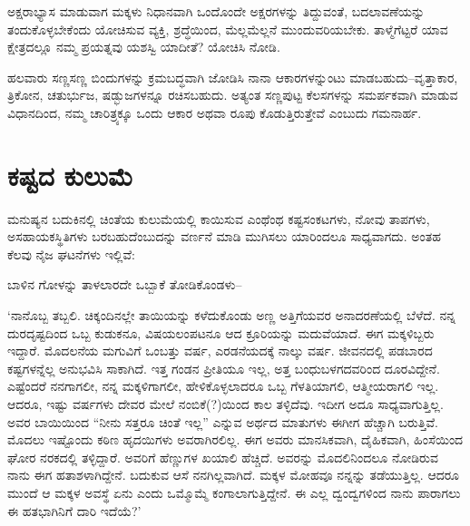 ಅಕ್ಷರಾಭ್ಯಾಸ ಮಾಡುವಾಗ ಮಕ್ಕಳು ನಿಧಾನವಾಗಿ ಒಂದೊಂದೇ ಅಕ್ಷರಗಳನ್ನು ತಿದ್ದುವಂತೆ, ಬದಲಾವಣೆಯನ್ನು ತಂದುಕೊಳ್ಳಬೇಕೆಂದು ಯೋಚಿಸುವ ವ್ಯಕ್ತಿ, ಶ್ರದ್ಧೆಯಿಂದ, ಮೆಲ್ಲಮೆಲ್ಲನೆ ಮುಂದುವರಿಯಬೇಕು. ತಾಳ್ಮೆಗೆಟ್ಟರೆ ಯಾವ ಕ್ಷೇತ್ರದಲ್ಲೂ ನಮ್ಮ ಪ್ರಯತ್ನವು ಯಶಸ್ವಿ ಯಾದೀತೆ? ಯೋಚಿಸಿ ನೋಡಿ.

ಹಲವಾರು ಸಣ್ಣಸಣ್ಣ ಬಿಂದುಗಳನ್ನು ಕ್ರಮಬದ್ಧವಾಗಿ ಜೋಡಿಸಿ ನಾನಾ ಆಕಾರಗಳನ್ನುಂಟು ಮಾಡಬಹುದು–ವೃತ್ತಾಕಾರ, ತ್ರಿಕೋನ, ಚತುರ್ಭುಜ, ಷಡ್ಭುಜಗಳನ್ನೂ ರಚಿಸಬಹುದು. ಅತ್ಯಂತ ಸಣ್ಣಪುಟ್ಟ ಕೆಲಸಗಳನ್ನು ಸಮರ್ಪಕವಾಗಿ ಮಾಡುವ ವಿಧಾನದಿಂದ, ನಮ್ಮ ಚಾರಿತ್ರ್ಯಕ್ಕೂ ಒಂದು ಆಕಾರ ಅಥವಾ ರೂಪು ಕೊಡುತ್ತಿರುತ್ತೇವೆ ಎಂಬುದು ಗಮನಾರ್ಹ.


\section*{ಕಷ್ಟದ ಕುಲುಮೆ}


ಮನುಷ್ಯನ ಬದುಕಿನಲ್ಲಿ ಚಿಂತೆಯ ಕುಲುಮೆಯಲ್ಲಿ ಕಾಯಿಸುವ ಎಂಥೆಂಥ ಕಷ್ಟಸಂಕಟಗಳು, ನೋವು ತಾಪಗಳು, ಅಸಹಾಯಕಸ್ಥಿತಿಗಳು ಬರಬಹುದೆಂಬುದನ್ನು ವರ್ಣನೆ ಮಾಡಿ ಮುಗಿಸಲು ಯಾರಿಂದಲೂ ಸಾಧ್ಯವಾಗದು. ಅಂತಹ ಕೆಲವು ನೈಜ ಘಟನೆಗಳು ಇಲ್ಲಿವೆ:

ಬಾಳಿನ ಗೋಳನ್ನು ತಾಳಲಾರದೇ ಒಬ್ಬಾಕೆ ತೋಡಿಕೊಂಡಳು–

\newpage

‘ನಾನೊಬ್ಬ ತಬ್ಬಲಿ. ಚಿಕ್ಕಂದಿನಲ್ಲೇ ತಾಯಿಯನ್ನು ಕಳೆದುಕೊಂಡು ಅಣ್ಣ ಅತ್ತಿಗೆಯವರ ಅನಾದರಣೆಯಲ್ಲಿ ಬೆಳೆದೆ. ನನ್ನ ದುರದೃಷ್ಟದಿಂದ ಒಬ್ಬ ಕುಡುಕನೂ, ವಿಷಯಲಂಪಟನೂ ಆದ ಕ್ರೂರಿಯನ್ನು ಮದುವೆಯಾದೆ. ಈಗ ಮಕ್ಕಳಿಬ್ಬರು ಇದ್ದಾರೆ. ಮೊದಲನೆಯ ಮಗುವಿಗೆ ಒಂಬತ್ತು ವರ್ಷ, ಎರಡನೆಯದಕ್ಕೆ ನಾಲ್ಕು ವರ್ಷ. ಜೀವನದಲ್ಲಿ ಪಡಬಾರದ ಕಷ್ಟಗಳನ್ನೆಲ್ಲ ಅನುಭವಿಸಿ ಸಾಕಾಗಿದೆ. ಇತ್ತ ಗಂಡನ ಪ್ರೀತಿಯೂ ಇಲ್ಲ, ಅತ್ತ ಬಂಧುಬಳಗದವರಿಂದ ದೂರ\-ವಿದ್ದೇನೆ. ಎಷ್ಟೆಂದರೆ ನನಗಾಗಲೀ, ನನ್ನ ಮಕ್ಕಳಿಗಾಗಲೀ, ಹೇಳಿಕೊಳ್ಳಲಾದರೂ ಒಬ್ಬ ಗೆಳತಿಯಾಗಲಿ, ಆತ್ಮೀಯರಾಗಲಿ ಇಲ್ಲ. ಆದರೂ, ಇಷ್ಟು ವರ್ಷಗಳು ದೇವರ ಮೇಲೆ ನಂಬಿಕೆ(?)ಯಿಂದ ಕಾಲ ತಳ್ಳಿದೆವು. ಇದೀಗ ಅದೂ ಸಾಧ್ಯವಾಗುತ್ತಿಲ್ಲ. ಅವರ ಬಾಯಿಯಿಂದ “ನೀನು ಸತ್ತರೂ ಚಿಂತೆ ಇಲ್ಲ” ಎನ್ನುವ ಅರ್ಥದ ಮಾತುಗಳು ಈಗೀಗ ಹೆಚ್ಚಾಗಿ ಬರುತ್ತಿವೆ. ಮೊದಲು ಇಷ್ಟೊಂದು ಕಠಿಣ ಹೃದಯಿಗಳು ಅವರಾಗಿರಲಿಲ್ಲ. ಈಗ ಅವರು ಮಾನಸಿಕವಾಗಿ, ದೈಹಿಕವಾಗಿ, ಹಿಂಸೆಯಿಂದ ಘೋರ ನರಕದಲ್ಲಿ ತಳ್ಳಿದ್ದಾರೆ. ಅವರಿಗೆ ಹೆಣ್ಣುಗಳ ಖಯಾಲಿ ಹೆಚ್ಚಿದೆ. ಅವರನ್ನು ಮೊದಲಿನಿಂದಲೂ ನೋಡಿರುವ ನಾನು ಈಗ ಹತಾಶಳಾಗಿದ್ದೇನೆ. ಬದುಕುವ ಆಸೆ ನನಗಿಲ್ಲವಾಗಿದೆ. ಮಕ್ಕಳ ಮೋಹವೂ ನನ್ನನ್ನು ತಡೆಯುತ್ತಿಲ್ಲ. ಆದರೂ ಮುಂದೆ ಆ ಮಕ್ಕಳ ಅವಸ್ಥೆ ಏನು ಎಂದು ಒಮ್ಮೊಮ್ಮೆ ಕಂಗಾಲಾಗುತ್ತಿದ್ದೇನೆ. ಈ ಎಲ್ಲ ದ್ವಂದ್ವಗಳಿಂದ ನಾನು ಪಾರಾಗಲು ಈ ಹತ\-ಭಾಗಿನಿಗೆ ದಾರಿ ಇದೆಯೆ?’

